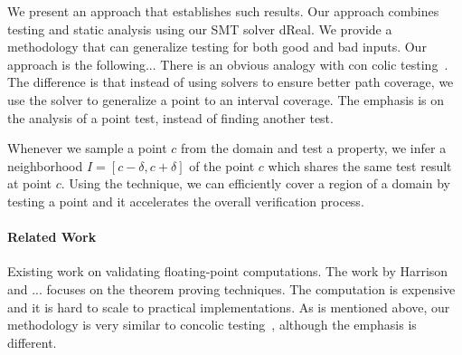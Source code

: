 We present an approach that establishes such results. Our approach combines testing and static analysis using our SMT solver dReal. We provide a methodology that can generalize testing for both good and bad inputs. Our approach is the following... There is an obvious analogy with con colic testing~\cite{}. The difference is that instead of using solvers to ensure better path coverage, we use the solver to generalize a point to an interval coverage. The emphasis is on the analysis of a point test, instead of finding another test. 

Whenever we sample a point $c$ from the domain and test a property,
we infer a neighborhood $I = [c - \delta, c + \delta]$ of the point $c$
which shares the same test result at point $c$. Using the technique,
we can efficiently cover a region of a domain by testing a point and
it accelerates the overall verification process.


\paragraph{Related Work} Existing work on validating floating-point computations. The work by Harrison and ... focuses on the theorem proving techniques. The computation is expensive and it is hard to scale to practical implementations. As is mentioned above, our methodology is very similar to concolic testing~\cite{}, although the emphasis is different. 



